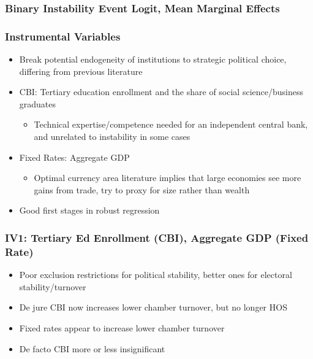 \documentclass{beamer}
\begin{document}
    \begin{frame}
        \frametitle{Binary Instability Event Logit, Mean Marginal Effects}
        {
            \let\oldcentering\centering
            \renewcommand\centering{\tiny\oldcentering}
            
        }
    \end{frame}

    \begin{frame}
        \frametitle{Instrumental Variables}
        \begin{itemize}
            \item Break potential endogeneity of institutions to strategic political choice, differing from previous literature
            \item CBI: Tertiary education enrollment and the share of social science/business graduates
            \begin{itemize}
                \item Technical expertise/competence needed for an independent central bank, and unrelated to instability in some cases
            \end{itemize}
            \item Fixed Rates: Aggregate GDP
            \begin{itemize}
                \item Optimal currency area literature implies that large economies see more gains from trade, try to proxy for size rather than wealth
            \end{itemize}
            \item Good first stages in robust regression
        \end{itemize}
    \end{frame}

    \begin{frame}
        \frametitle{IV1: Tertiary Ed Enrollment (CBI), Aggregate GDP (Fixed Rate)}
        \begin{itemize}
            \item Poor exclusion restrictions for political stability, better ones for electoral stability/turnover
            \item De jure CBI now increases lower chamber turnover, but no longer HOS
            \item Fixed rates appear to increase lower chamber turnover
            \item De facto CBI more or less insignificant
        \end{itemize}
    \end{frame}
\end{document}
